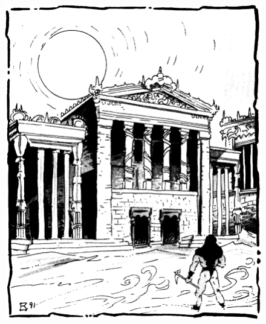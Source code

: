 \begin{figure}[t!]
\centering
\includegraphics[width=\columnwidth]{images/balic-1.png}
\WOTC
\end{figure}

